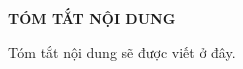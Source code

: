 \documentclass[../main.tex]{subfiles}
\begin{document}
\begin{center}
    \Large{\textbf{TÓM TẮT NỘI DUNG}}\\
\end{center}
\vspace{1cm}

Tóm tắt nội dung sẽ được viết ở đây.

\end{document}
